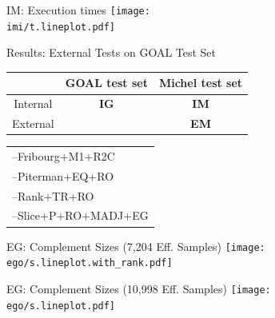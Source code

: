 \documentclass[12pt]{beamer}
\newcommand{\fat}[1]{\textbf{#1}}
\newcommand{\ego}{../results/figures/external/goal}
\newcommand{\imi}{../results/figures/internal/michel}
\newcommand{\activecell}[1]{\cellcolor{red}\color{white}{#1}}
\newcommand{\myitem}{--\hspace*{\labelsep}}
\newcommand{\egol}{
\begin{tabular}{l}
\myitem Fribourg+M1+R2C \\
\myitem Piterman+EQ+RO \\
\myitem Rank+TR+RO \\
\myitem Slice+P+RO+MADJ+EG \\
\end{tabular}}
\begin{document}
\begin{frame}{IM: Execution times}
\centering
\texttt{[image: \\imi/t.lineplot.pdf]}
\end{frame}

\begin{frame}{Results: External Tests on GOAL Test Set}
\begin{center}
{\renewcommand{\arraystretch}{1.25}
\begin{tabular}{c|c|c}
         & GOAL test set & Michel test set \\ \hline
Internal & \fat{IG}                  & \fat{IM}        \\ \hline
External & \activecell{\fat{EG}}     & \fat{EM}        \\
\end{tabular}}

\vspace{1.4cm}
\egol
\end{center}
\end{frame}

\begin{frame}{EG: Complement Sizes (7,204 Eff. Samples)}
\centering
\hspace{0.5cm}
\texttt{[image: \\ego/s.lineplot.with\_rank.pdf]}
\end{frame}

\begin{frame}{EG: Complement Sizes (10,998 Eff. Samples)}
\centering
\hspace{0.5cm}
\texttt{[image: \\ego/s.lineplot.pdf]}
\end{frame}
\end{document}
